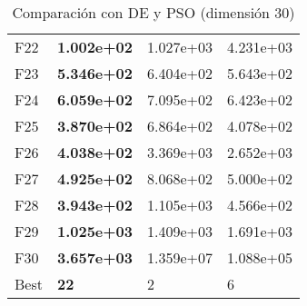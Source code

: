\documentclass[10pt,a4paper]{article}
\begin{document}
\begin{table}[]
\begin{tabular}{|l|l|l|l|}
		F22  & \textbf{1.002e+02} & 1.027e+03          & 4.231e+03          \\
		F23  & \textbf{5.346e+02} & 6.404e+02          & 5.643e+02          \\
		F24  & \textbf{6.059e+02} & 7.095e+02          & 6.423e+02          \\
		F25  & \textbf{3.870e+02} & 6.864e+02          & 4.078e+02          \\
		F26  & \textbf{4.038e+02} & 3.369e+03          & 2.652e+03          \\
		F27  & \textbf{4.925e+02} & 8.068e+02          & 5.000e+02          \\
		F28  & \textbf{3.943e+02} & 1.105e+03          & 4.566e+02          \\
		F29  & \textbf{1.025e+03} & 1.409e+03          & 1.691e+03          \\
		F30  & \textbf{3.657e+03} & 1.359e+07          & 1.088e+05          \\ \hline
		Best & \textbf{22}        & 2                  & 6                  \\ \hline
	\end{tabular}
	\caption{Comparación con DE y PSO (dimensión 30)}
	\label{table:mimh2_dim30}
\end{table}
\end{document}
